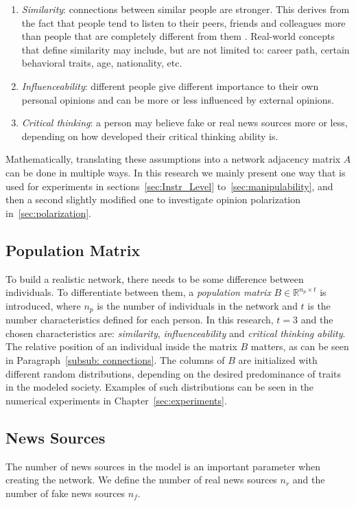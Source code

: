 \renewcommand{\theenumi}{\roman{enumi}}
\begin{enumerate}
\item \textit{Similarity}: connections between similar people are stronger. This derives from the fact that people tend to listen to their peers, friends and colleagues more than people that are completely different from them \cite{Youyou2017}\cite{Afifi2013}. Real-world concepts that define similarity may include, but are not limited to: career path, certain behavioral traits, age, nationality, etc.

\item \textit{Influenceability}: different people give different importance to their own personal opinions and can be more or less influenced by external opinions.
\item \textit{Critical thinking}: a person may believe fake or real news sources more or less, depending on how developed their critical thinking ability is.
\end{enumerate}
Mathematically, 
translating these assumptions into a network adjacency matrix $A$ can be done in multiple ways. In this research we mainly present one way that is used for experiments in sections~\ref{sec:Instr_Level} to~\ref{sec:manipulability}, and then a second slightly modified one to investigate opinion polarization in~\ref{sec:polarization}. 

\subsection{Population Matrix}
To build a realistic network, there needs to be some difference between individuals. To differentiate between them, a \textit{population matrix} $B \in \mathbb{R}^{n_p \times t}$ is introduced, where $n_p$ is the number of individuals in the network and $t$ is the number characteristics defined for each person. In this research, $t=3$ and the chosen characteristics are: \textit{similarity}, \textit{influenceability} and \textit{critical thinking ability}. The relative position of an individual inside the matrix $B$ matters, as can be seen in Paragraph~\ref{subsub: connections}. The columns of $B$ are initialized with different random distributions, depending on the desired predominance of traits in the modeled society. Examples of such distributions can be seen in the numerical experiments in Chapter~\ref{sec:experiments}.
\subsection{News Sources}
The number of news sources in the model is an important parameter when creating the network. We define the number of real news sources $n_{r}$ and the number of fake news sources $n_{f}$.
